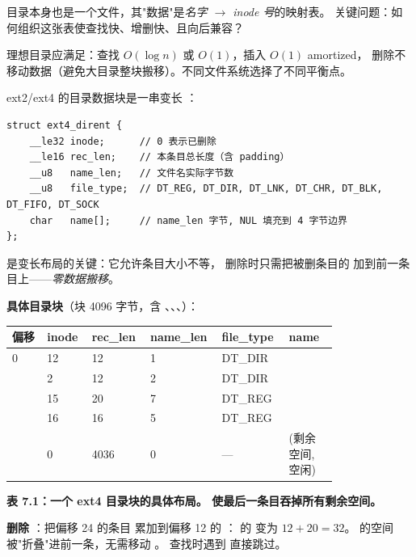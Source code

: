 \begin{filesystemlayout}

目录本身也是一个文件，其"数据"是\emph{名字 $\rightarrow$ inode 号}的映射表。
关键问题：如何组织这张表使查找快、增删快、且向后兼容？

理想目录应满足：查找 $O(\log n)$ 或 $O(1)$，插入 $O(1)$ amortized，
删除不移动数据（避免大目录整块搬移）。不同文件系统选择了不同平衡点。


ext2/ext4 的目录数据块是一串变长 ：

\begin{lstlisting}
struct ext4_dirent {
    __le32 inode;      // 0 表示已删除
    __le16 rec_len;    // 本条目总长度（含 padding）
    __u8   name_len;   // 文件名实际字节数
    __u8   file_type;  // DT_REG, DT_DIR, DT_LNK, DT_CHR, DT_BLK, DT_FIFO, DT_SOCK
    char   name[];     // name_len 字节, NUL 填充到 4 字节边界
};
\end{lstlisting}

 是变长布局的关键：它允许条目大小不等，
删除时只需把被删条目的  加到前一条目上——\emph{零数据搬移}。

\textbf{具体目录块}（块 4096 字节，含 、、、）：

\begin{longtable}{|F{0.10\linewidth}|F{0.11\linewidth}|F{0.14\linewidth}|F{0.14\linewidth}|F{0.17\linewidth}|F{0.14\linewidth}|}
\toprule
{}
\textbf{偏移} & \textbf{inode} & \textbf{rec\_len} & \textbf{name\_len} & \textbf{file\_type} & \textbf{name} \\
    & 12     & 12  & 1  & DT\_DIR  &  \\   & 2      & 12  & 2  & DT\_DIR  &  \\   & 15     & 20  & 7  & DT\_REG  &  \\   & 16     & 16  & 5  & DT\_REG  &  \\   & 0      & 4036& 0  & ---      & (剩余空间, 空闲) \\
\bottomrule
\end{longtable}

{\par\noindent\textbf{表 7.1：一个 ext4 目录块的具体布局。 使最后一条目吞掉所有剩余空间。}\par}

\textbf{删除 }：把偏移 24 的条目  累加到偏移 12 的 ：
 的  变为 $12 + 20 = 32$。
 的空间被"折叠"进前一条，无需移动 。
查找时遇到  直接跳过。


\end{filesystemlayout}
